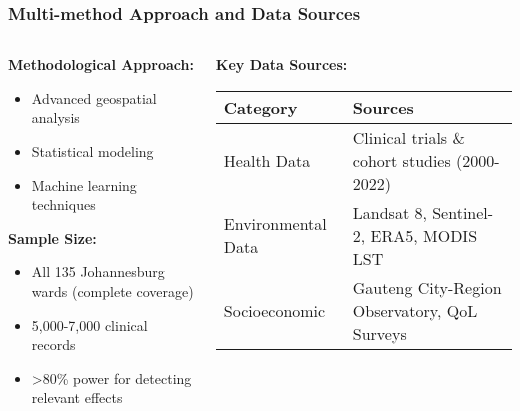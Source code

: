 \documentclass[aspectratio=169]{beamer}
\begin{document}
\begin{frame}
    \frametitle{Multi-method Approach and Data Sources}
    
    \begin{columns}[T]
        \begin{column}{0.48\textwidth}
            \textbf{\large Methodological Approach:}
            \begin{itemize}[leftmargin=*, itemsep=6pt]
                \item Advanced geospatial analysis
                \item Statistical modeling
                \item Machine learning techniques
            \end{itemize}
            
            \textbf{\large Sample Size:}
            \begin{itemize}[leftmargin=*, itemsep=6pt]
                \item All 135 Johannesburg wards (complete coverage)
                \item 5,000-7,000 clinical records
                \item >80\% power for detecting relevant effects
            \end{itemize}
        \end{column}
        \begin{column}{0.48\textwidth}
            \textbf{\large Key Data Sources:}
            \begin{table}[h]
                \small
                \begin{tabular}{p{2.5cm}p{3cm}}
                    \toprule
                    \textbf{Category} & \textbf{Sources} \\
                    \midrule
                    Health Data & Clinical trials \& cohort studies (2000-2022) \\
                    \addlinespace
                    Environmental Data & Landsat 8, Sentinel-2, ERA5, MODIS LST \\
                    \addlinespace
                    Socioeconomic & Gauteng City-Region Observatory, QoL Surveys \\
                    \bottomrule
                \end{tabular}
            \end{table}
            
        \end{column}
    \end{columns}
\end{frame}
\end{document}
